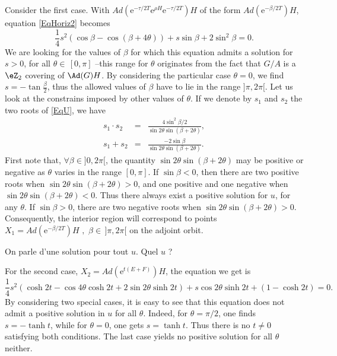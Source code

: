 Consider the first case. With $ Ad(\mbox{e}^{-\tau/2 T} \mbox{e}^{\rho H} \mbox{e}^{-\tau/2 T}) H$ of the form $Ad(\mbox{e}^{-\beta/2 T})H$, equation \eqref{EqHoriz2} becomes 
\begin{equation}  \label{EqU}
 \frac{1}{4} s^2 (\cos \beta - \cos(\beta + 4\theta)) + s \sin
 \beta  + 2 \sin^2 \beta = 0.
\end{equation}
We are looking for the values of $\beta$ for which this equation admits a solution for $s>0$, for all $\theta \in \, [0,\pi]$ --this range for $\theta$ originates from the fact that $G/A$ is a $\eZ_2$ covering of $\Ad(G)H$.  By considering the particular case $\theta = 0$, we find $s=-\tan \frac{\beta}{2}$, thus the allowed values of $\beta$ have to lie in the range $]\pi,2\pi[$. Let us look at the constrains imposed by other values of $\theta$. If we denote by $s_1$ and $s_2$ the two roots of \eqref{EqU}, we have
\begin{eqnarray}
 s_1\cdot s_2 &=& \frac{4 \sin^2 \beta/2}{\sin 2\theta \sin(\beta +
 2 \theta)}, \label{PrRac} \\
 s_1 + s_2 &=& \frac{- 2 \sin \beta}{\sin 2\theta \sin(\beta +
 2\theta)}.
 \end{eqnarray}
First note that, $\forall \beta \in ]0,2\pi[$, the quantity $\sin 2\theta \sin(\beta + 2\theta)$ may be positive or negative as $\theta$ varies in the range $[0,\pi]$. If $\sin \beta < 0$, then there are two positive roots when $\sin 2\theta \sin(\beta + 2\theta)>0$, and one positive and one negative when $\sin 2\theta \sin(\beta + 2\theta)<0$. Thus there always exist a positive solution for $u$, for any $\theta$. If $\sin \beta > 0$, there are two negative roots when $\sin 2\theta \sin(\beta + 2\theta)>0$. Consequently, the interior region will correspond to points $X_1 = Ad(\mbox{e}^{-\beta/2 T})H \, \, , \, \, \beta \in \,]\pi , 2\pi[ $ on the adjoint orbit.
\begin{probleme}
On parle d'une solution pour tout $u$. Quel $u$ ?
\end{probleme}

For the second case, $X_2 =Ad(\mbox{e}^{t (E+F)})H$, the equation we get is
\begin{equation}
 \frac{1}{4} s^2 (\cosh 2t - \cos 4\theta \cosh 2t + 2 \sin
 2\theta \sinh 2t) + s \cos 2\theta \sinh 2t + (1 - \cosh 2t) = 0.
 \end{equation}
 By considering two special cases, it is easy to see that this equation does not admit a positive solution in $u$ for all $\theta$. Indeed, for $\theta = \pi/2$, one finds $s =-\tanh t$, while for $\theta = 0$, one gets $s=\tanh t$. Thus there is no $t\ne 0$ satisfying both conditions. The last case yields no positive solution for all $\theta$ neither.

